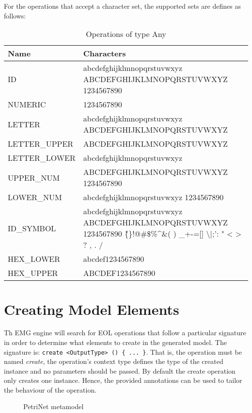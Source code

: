 For the operations that accept a character set, the supported sets are defines as follows:
\begin{longtabu} {|p{6.5cm}|X|}
\caption{Operations of type Any}
\label{tab:charsets}\\
\hline
\textbf{Name} & \textbf{Characters} \\\hline
ID							 & abcdefghijklmnopqrstuvwxyz ABCDEFGHIJKLMNOPQRSTUVWXYZ 1234567890\\\hline
NUMERIC			  	  & 1234567890\\\hline
LETTER 					& abcdefghijklmnopqrstuvwxyz ABCDEFGHIJKLMNOPQRSTUVWXYZ\\\hline
LETTER\_UPPER 	  & ABCDEFGHIJKLMNOPQRSTUVWXYZ\\\hline
LETTER\_LOWER	 & abcdefghijklmnopqrstuvwxyz\\\hline
UPPER\_NUM         & ABCDEFGHIJKLMNOPQRSTUVWXYZ 1234567890\\\hline
LOWER\_NUM        & abcdefghijklmnopqrstuvwxyz 1234567890\\\hline
ID\_SYMBOL 			 & abcdefghijklmnopqrstuvwxyz ABCDEFGHIJKLMNOPQRSTUVWXYZ 1234567890 \~\{\}!@\#\$\%\textasciicircum\&\textasteriskcentered( ) \_+-=[] \textbackslash {}|;': " < > ? , . /  \\\hline     %
HEX\_LOWER 		   & abcdef1234567890\\\hline
HEX\_UPPER 			& ABCDEF1234567890\\\hline
\end{longtabu}

\section{Creating Model Elements}\label{sec:emg.createElements}

Th EMG engine will search for EOL operations that follow a particular signature in order to determine what elements to create in the generated model. The signature is: \texttt{create <OutputType> () \{ ... \}}. That is, the operation must be named \emph{create}, the operation's context type defines the type of the created instance and no parameters should be passed. By default the create operation only creates one instance. Hence, the provided annotations can be used to tailor the behaviour of the operation.

\begin{figure}[htbp]
    \begin{center}
        \caption{PetriNet metamodel}
        \label{fig:PetriNetMM}
    \end{center}
\end{figure}


